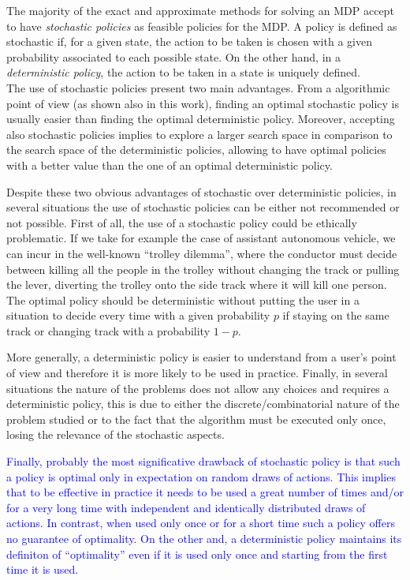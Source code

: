 \documentclass[sigconf]{aamas}  %
\newcommand{\ET}[1]{{\textcolor{blue}{#1}}}
\begin{document}
The majority of the exact and approximate methods for solving an MDP accept to have \textit{stochastic policies} as feasible policies for the MDP. A policy is defined as stochastic if, for a given state, the action to be taken is chosen with a given probability associated to each possible state.
On the other hand, in a \textit{deterministic policy}, the action to be taken in a state is uniquely defined.\\
The use of stochastic policies present two main advantages. From a algorithmic point of view (as shown also in this work), finding an optimal stochastic policy is usually easier than finding the optimal deterministic policy. Moreover, accepting also stochastic policies implies to explore a larger search space in comparison to the search space of the deterministic policies, allowing to have optimal policies with a better value than the one of an optimal deterministic policy.

Despite these two obvious advantages of stochastic over deterministic policies, in several situations the use of stochastic policies can be either not recommended or not possible. 
%
%
First of all, the use of a stochastic policy could be ethically problematic. If we take for example the case of assistant autonomous vehicle, we can incur in the well-known ``trolley dilemma'', where the conductor must decide between killing all the people in the trolley without changing the track or pulling the lever, diverting the trolley onto the side track where it will kill one person. The optimal policy should be deterministic without putting the user in a situation to decide every time with a given probability $p$ if staying on the same track or changing track with a probability $1-p$. 

More generally, a deterministic policy is easier to understand from a user's point of view and therefore it is more likely to be used in practice. Finally, in several situations the nature of the problems does not allow any choices and requires a deterministic policy, this is due to either the discrete/combinatorial nature of the problem studied or to the fact that the algorithm must be executed only once, losing the relevance of the stochastic aspects. 

\ET{
Finally, probably the most significative drawback of stochastic policy is that 
such a policy is 
optimal only in expectation on random draws of actions. This implies that to be effective in practice it needs to be used a great number of times and/or for a very long time with independent and identically distributed draws of actions. In contrast, when used only once or for a short time such a policy offers no guarantee of optimality. On the other and, a deterministic policy maintains its definiton of ``optimality'' even if it is used only once and starting from the first time it is used.
}
\end{document}

